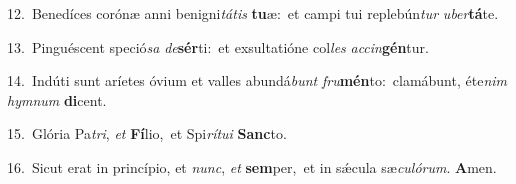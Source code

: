 {\numbfont\textcolor{\numbcolor}{12.}}~Benedíces corónæ anni benigni\-\textit{tá}\-\textit{tis} \textbf{tu}\-æ:~\star et campi tui replebún\textit{tur} \textit{u}\-\textit{ber}\textbf{tá}te.\par
{\numbfont\textcolor{\numbcolor}{13.}}~Pinguéscent speció\textit{sa} \textit{de}\-\textbf{sér}ti:~\star et exsultatióne col\textit{les} \textit{ac}\-\textit{cin}\textbf{gén}tur.\par
{\numbfont\textcolor{\numbcolor}{14.}}~Indúti sunt aríetes óvium et valles abundá\textit{bunt} \textit{fru}\-\textbf{mén}to:~\star clamábunt, éte\textit{nim} \textit{hym}\-\textit{num} \textbf{di}\-cent.\par
{\numbfont\textcolor{\numbcolor}{15.}}~Glória Pa\-\textit{tri}\-, \textit{et} \textbf{Fí}\-lio,~\star et Spi\-\textit{rí}\-\textit{tu}\textit{i} \textbf{Sanc}\-to.\par
{\numbfont\textcolor{\numbcolor}{16.}}~Sicut erat in princípio, et \textit{nunc}\-, \textit{et} \textbf{sem}\-per,~\star et in sǽcula sæ\-\textit{cu}\-\textit{ló}\textit{rum}. \textbf{A}\-men.\par
